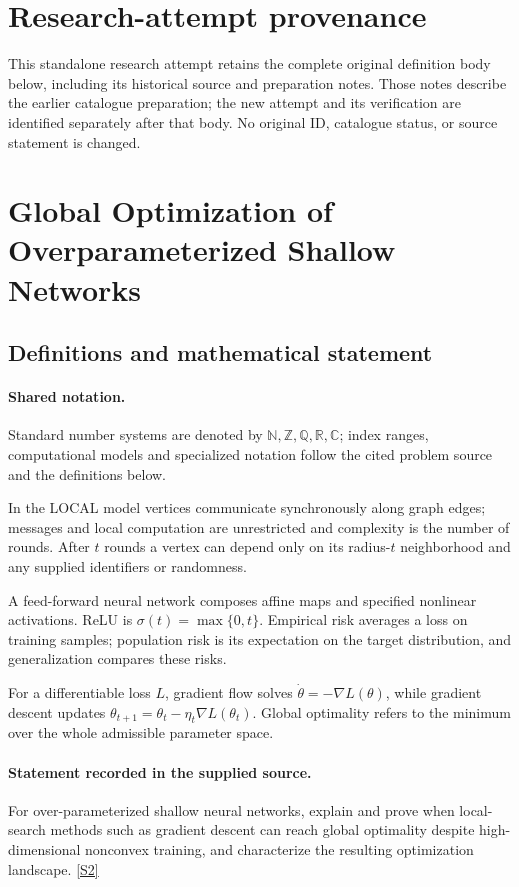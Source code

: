 \documentclass[11pt]{article}
\begin{document}
\section*{Research-attempt provenance}
This standalone research attempt retains the complete original definition body below,
including its historical source and preparation notes. Those notes describe the
earlier catalogue preparation; the new attempt and its verification are identified
separately after that body. No original ID, catalogue status, or source statement is changed.

\section{Global Optimization of Overparameterized Shallow Networks}\label{statement}

\subsection{Definitions and mathematical statement}

\paragraph{Shared notation.}Standard number systems are denoted by $\mathbb N,\mathbb Z,\mathbb Q,\mathbb R,\mathbb C$; index ranges, computational models and specialized notation follow the cited problem source and the definitions below.


In the LOCAL model vertices communicate synchronously along graph edges; messages and local computation are unrestricted and complexity is the number of rounds. After $t$ rounds a vertex can depend only on its radius-$t$ neighborhood and any supplied identifiers or randomness.

A feed-forward neural network composes affine maps and specified nonlinear activations. ReLU is $\sigma(t)=\max\{0,t\}$. Empirical risk averages a loss on training samples; population risk is its expectation on the target distribution, and generalization compares these risks.

For a differentiable loss $L$, gradient flow solves $\dot\theta=-\nabla L(\theta)$, while gradient descent updates $\theta_{t+1}=\theta_t-\eta_t\nabla L(\theta_t)$. Global optimality refers to the minimum over the whole admissible parameter space.
\paragraph{Statement recorded in the supplied source.}
For over-parameterized shallow neural networks, explain and prove when local-search methods such as gradient descent can reach global optimality despite high-dimensional nonconvex training, and characterize the resulting optimization landscape. \href{https://doi.org/10.4171/owr/2018/14}{[S2]}
\end{document}
